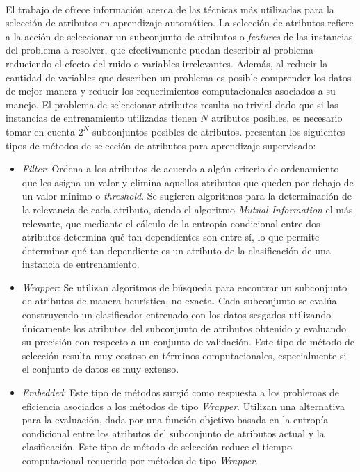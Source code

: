 \paragraph{} El trabajo de \citet{fs-survey} ofrece información acerca de las técnicas más utilizadas para la selección de atributos en aprendizaje automático.
La selección de atributos refiere a la acción de seleccionar un subconjunto de atributos o \textit{features} de las instancias del problema a resolver, que efectivamente puedan describir al problema reduciendo el efecto del ruido o variables irrelevantes.
Además, al reducir la cantidad de variables que describen un problema es posible comprender los datos de mejor manera y reducir los requerimientos computacionales asociados a su manejo.
El problema de seleccionar atributos resulta no trivial dado que si las instancias de entrenamiento utilizadas tienen $N$ atributos posibles, es necesario tomar en cuenta $2^N$ subconjuntos posibles de atributos.
\citet{fs-survey} presentan los siguientes tipos de métodos de selección de atributos para aprendizaje supervisado:
\begin{itemize}
\item \textit{Filter}: Ordena a los atributos de acuerdo a algún criterio de ordenamiento que les asigna un valor y elimina aquellos atributos que queden por debajo de un valor mínimo o \textit{threshold}.
Se sugieren algoritmos para la determinación de la relevancia de cada atributo, siendo el algoritmo \textit{Mutual Information} el más relevante, que mediante el cálculo de la entropía condicional entre dos atributos determina qué tan dependientes son entre sí, lo que permite determinar qué tan dependiente es un atributo de la clasificación de una instancia de entrenamiento.
\item \textit{Wrapper}: Se utilizan algoritmos de búsqueda para encontrar un subconjunto de atributos de manera heurística, no exacta.
Cada subconjunto se evalúa construyendo un clasificador entrenado con los datos sesgados utilizando únicamente los atributos del subconjunto de atributos obtenido y evaluando su precisión con respecto a un conjunto de validación.
Este tipo de método de selección resulta muy costoso en términos computacionales, especialmente si el conjunto de datos es muy extenso.
\item \textit{Embedded}: Este tipo de métodos surgió como respuesta a los problemas de eficiencia asociados a los métodos de tipo \textit{Wrapper}.
Utilizan una alternativa para la evaluación, dada por una función objetivo basada en la entropía condicional entre los atributos del subconjunto de atributos actual y la clasificación.
Este tipo de método de selección reduce el tiempo computacional requerido por métodos de tipo \textit{Wrapper}.
\end{itemize}
